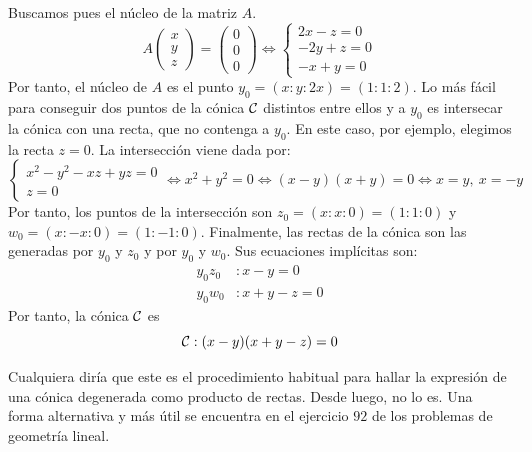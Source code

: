 \begin{exa}
	Buscamos pues el núcleo de la matriz $A$.
	\begin{equation}
	A\left( \begin{array}{c}
	x\\y\\z
	\end{array}\right) =\left( \begin{array}{c}
	0\\0\\0
	\end{array}\right)\Leftrightarrow
	\begin{cases}
	2x-z=0\\
	-2y+z=0\\
	-x+y=0
	\end{cases}
	\end{equation}
	Por tanto, el núcleo de $A$ es el punto $y_0=(x:y:2x)=(1:1:2)$. Lo más fácil para conseguir dos puntos de la cónica $\mathcal{C}$ distintos entre ellos y a $y_0$ es intersecar la cónica con una recta, que no contenga a $y_0$. En este caso, por ejemplo, elegimos la recta $z=0$. La intersección viene dada por:
	\begin{equation}
	\begin{cases}
	x^2-y^2-xz+yz=0\\
	z=0
	\end{cases}\Leftrightarrow x^2+y^2=0\Leftrightarrow (x-y)(x+y)=0\Leftrightarrow x=y, \ x=-y
	\end{equation}
	Por tanto, los puntos de la intersección son $z_0=(x:x:0)=(1:1:0)$ y $w_0=(x:-x:0)=(1:-1:0)$. Finalmente, las rectas de la cónica son las generadas por $y_0$ y $z_0$ y por $y_0$ y $w_0$. Sus ecuaciones implícitas son:
	\begin{equation}
	\begin{split}
	y_0z_0&:x-y=0\\
	y_0w_0&:x+y-z=0
	\end{split}
	\end{equation}
	Por tanto, la cónica $\mathcal{C}$ es
	\begin{equation}
	\mathcal{C}: (x-y)(x+y-z)=0
	\end{equation}
\end{exa}
Cualquiera diría que este es el procedimiento habitual para hallar la expresión de una cónica degenerada como producto de rectas. Desde luego, no lo es. Una forma alternativa y más útil se encuentra en el ejercicio $92$ de los problemas de geometría lineal.
